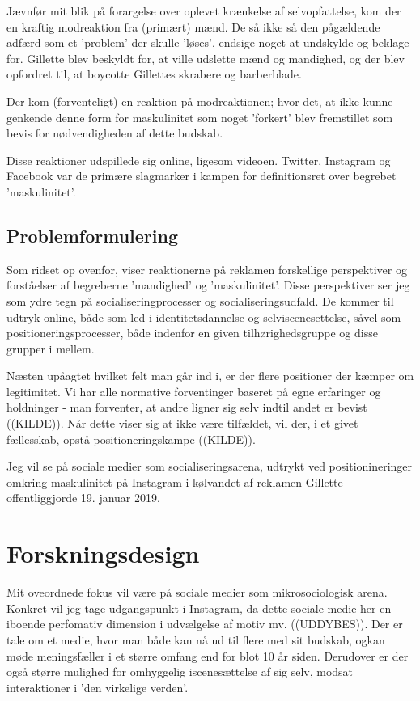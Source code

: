 Jævnfør mit blik på forargelse over oplevet krænkelse af selvopfattelse, kom
der en kraftig modreaktion fra (primært) mænd.  De så ikke så den pågældende
adfærd som et 'problem' der skulle 'løses', endsige noget at undskylde og
beklage for. Gillette blev beskyldt for, at ville udslette mænd og mandighed,
og der blev opfordret til, at boycotte Gillettes skrabere og barberblade. 

Der kom (forventeligt) en reaktion på modreaktionen; hvor det, at ikke kunne
genkende denne form for maskulinitet som noget 'forkert' blev fremstillet som
bevis for nødvendigheden af dette budskab. 

Disse reaktioner udspillede sig online, ligesom videoen. Twitter, Instagram og
Facebook var de primære slagmarker i kampen for definitionsret over begrebet
'maskulinitet'.

\subsection{Problemformulering}

Som ridset op ovenfor, viser reaktionerne på reklamen forskellige perspektiver
og forståelser af begreberne 'mandighed' og 'maskulinitet'. Disse perspektiver
ser jeg som ydre tegn på socialiseringprocesser og socialiseringsudfald. De
kommer til udtryk online, både som led i identitetsdannelse og
selviscenesettelse, såvel som positioneringsprocesser, både indenfor en given
tilhørighedsgruppe og disse grupper i mellem.

Næsten upåagtet hvilket felt man går ind i, er der flere positioner der kæmper
om legitimitet.  Vi har alle normative forventinger baseret på egne erfaringer
og holdninger - man forventer, at andre ligner sig selv indtil andet er bevist
((KILDE)). Når dette viser sig at ikke være tilfældet, vil der, i et givet
fællesskab, opstå positioneringskampe ((KILDE)). 


Jeg vil se på sociale medier som socialiseringsarena, udtrykt ved
positionineringer omkring maskulinitet på Instagram i kølvandet af reklamen
Gillette offentliggjorde 19. januar 2019.

\section{Forskningsdesign}

Mit oveordnede fokus vil være på sociale medier som mikrosociologisk
arena. Konkret vil jeg tage udgangspunkt i Instagram, da dette sociale medie
her en iboende perfomativ dimension i udvælgelse af motiv mv.  ((UDDYBES)).
Der er tale om et medie, hvor man både kan nå ud til flere med sit budskab,
ogkan møde meningsfæller i et større omfang end for blot 10 år siden. Derudover
er der også større mulighed for omhyggelig iscenesættelse af sig selv, modsat
interaktioner i 'den virkelige verden'.

